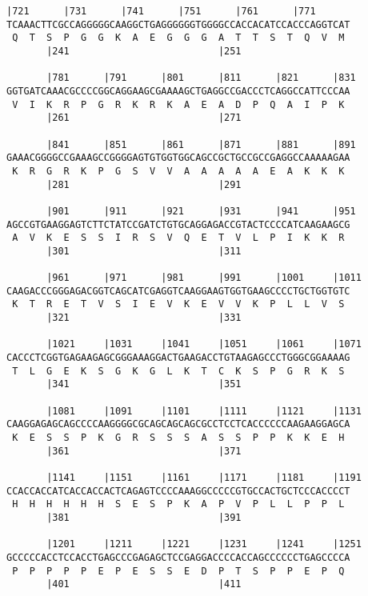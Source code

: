 \documentclass{article}
\begin{document}
\begin{Verbatim}[fontfamily=courier]
       |721      |731      |741      |751      |761      |771
TCAAACTTCGCCAGGGGGCAAGGCTGAGGGGGGTGGGGCCACCACATCCACCCAGGTCAT
 Q  T  S  P  G  G  K  A  E  G  G  G  A  T  T  S  T  Q  V  M 
       |241                          |251                   

       |781      |791      |801      |811      |821      |831
GGTGATCAAACGCCCCGGCAGGAAGCGAAAAGCTGAGGCCGACCCTCAGGCCATTCCCAA
 V  I  K  R  P  G  R  K  R  K  A  E  A  D  P  Q  A  I  P  K 
       |261                          |271                   

       |841      |851      |861      |871      |881      |891
GAAACGGGGCCGAAAGCCGGGGAGTGTGGTGGCAGCCGCTGCCGCCGAGGCCAAAAAGAA
 K  R  G  R  K  P  G  S  V  V  A  A  A  A  A  E  A  K  K  K 
       |281                          |291                   

       |901      |911      |921      |931      |941      |951
AGCCGTGAAGGAGTCTTCTATCCGATCTGTGCAGGAGACCGTACTCCCCATCAAGAAGCG
 A  V  K  E  S  S  I  R  S  V  Q  E  T  V  L  P  I  K  K  R 
       |301                          |311                   

       |961      |971      |981      |991      |1001     |1011
CAAGACCCGGGAGACGGTCAGCATCGAGGTCAAGGAAGTGGTGAAGCCCCTGCTGGTGTC
 K  T  R  E  T  V  S  I  E  V  K  E  V  V  K  P  L  L  V  S 
       |321                          |331                   

       |1021     |1031     |1041     |1051     |1061     |1071
CACCCTCGGTGAGAAGAGCGGGAAAGGACTGAAGACCTGTAAGAGCCCTGGGCGGAAAAG
 T  L  G  E  K  S  G  K  G  L  K  T  C  K  S  P  G  R  K  S 
       |341                          |351                   

       |1081     |1091     |1101     |1111     |1121     |1131
CAAGGAGAGCAGCCCCAAGGGGCGCAGCAGCAGCGCCTCCTCACCCCCCAAGAAGGAGCA
 K  E  S  S  P  K  G  R  S  S  S  A  S  S  P  P  K  K  E  H 
       |361                          |371                   

       |1141     |1151     |1161     |1171     |1181     |1191
CCACCACCATCACCACCACTCAGAGTCCCCAAAGGCCCCCGTGCCACTGCTCCCACCCCT
 H  H  H  H  H  H  S  E  S  P  K  A  P  V  P  L  L  P  P  L 
       |381                          |391                   

       |1201     |1211     |1221     |1231     |1241     |1251
GCCCCCACCTCCACCTGAGCCCGAGAGCTCCGAGGACCCCACCAGCCCCCCTGAGCCCCA
 P  P  P  P  P  E  P  E  S  S  E  D  P  T  S  P  P  E  P  Q 
       |401                          |411                   

\end{Verbatim}
\end{document}
